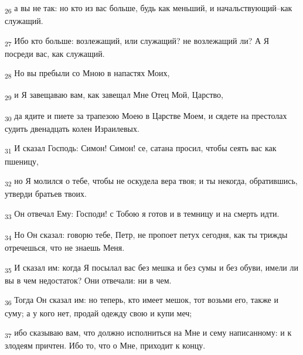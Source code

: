 \begin{tcolorbox}
\textsubscript{26} а вы не так: но кто из вас больше, будь как меньший, и начальствующий--как служащий.
\end{tcolorbox}
\begin{tcolorbox}
\textsubscript{27} Ибо кто больше: возлежащий, или служащий? не возлежащий ли? А Я посреди вас, как служащий.
\end{tcolorbox}
\begin{tcolorbox}
\textsubscript{28} Но вы пребыли со Мною в напастях Моих,
\end{tcolorbox}
\begin{tcolorbox}
\textsubscript{29} и Я завещаваю вам, как завещал Мне Отец Мой, Царство,
\end{tcolorbox}
\begin{tcolorbox}
\textsubscript{30} да ядите и пиете за трапезою Моею в Царстве Моем, и сядете на престолах судить двенадцать колен Израилевых.
\end{tcolorbox}
\begin{tcolorbox}
\textsubscript{31} И сказал Господь: Симон! Симон! се, сатана просил, чтобы сеять вас как пшеницу,
\end{tcolorbox}
\begin{tcolorbox}
\textsubscript{32} но Я молился о тебе, чтобы не оскудела вера твоя; и ты некогда, обратившись, утверди братьев твоих.
\end{tcolorbox}
\begin{tcolorbox}
\textsubscript{33} Он отвечал Ему: Господи! с Тобою я готов и в темницу и на смерть идти.
\end{tcolorbox}
\begin{tcolorbox}
\textsubscript{34} Но Он сказал: говорю тебе, Петр, не пропоет петух сегодня, как ты трижды отречешься, что не знаешь Меня.
\end{tcolorbox}
\begin{tcolorbox}
\textsubscript{35} И сказал им: когда Я посылал вас без мешка и без сумы и без обуви, имели ли вы в чем недостаток? Они отвечали: ни в чем.
\end{tcolorbox}
\begin{tcolorbox}
\textsubscript{36} Тогда Он сказал им: но теперь, кто имеет мешок, тот возьми его, также и суму; а у кого нет, продай одежду свою и купи меч;
\end{tcolorbox}
\begin{tcolorbox}
\textsubscript{37} ибо сказываю вам, что должно исполниться на Мне и сему написанному: и к злодеям причтен. Ибо то, что о Мне, приходит к концу.
\end{tcolorbox}
